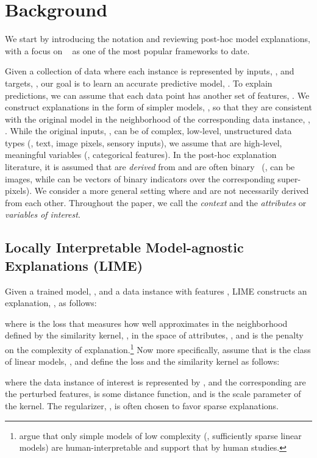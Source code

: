 \documentclass[twoside,11pt]{article}
\begin{document}
\section{Background}
\label{sec:background}

We start by introducing the notation and reviewing post-hoc model explanations, with a focus on {\LIME}~\citep{ribeiro2016trust} as one of the most popular frameworks to date.

Given a collection of data where each instance is represented by inputs, , and targets, , our goal is to learn an accurate predictive model, .
To explain predictions, we can assume that each data point has another set of features, .
We construct explanations in the form of simpler models, , so that they are consistent with the original model in the neighborhood of the corresponding data instance, \ie, .
While the original inputs, , can be of complex, low-level, unstructured data types (\eg, text, image pixels, sensory inputs), we assume that  are high-level, meaningful variables (\eg, categorical features).
In the post-hoc explanation literature, it is assumed that  are \emph{derived} from  and are often binary~\citep{lundberg2017shap} (\eg,  can be images, while  can be vectors of binary indicators over the corresponding super-pixels).
We consider a more general setting where  and  are not necessarily derived from each other.
Throughout the paper, we call  the \emph{context} and  the \emph{attributes} or \emph{variables of interest}.

\subsection*{Locally Interpretable Model-agnostic Explanations (LIME)}
\label{sec:lime}

Given a trained model, , and a data instance with features , LIME constructs an explanation, , as follows:

where  is the loss that measures how well  approximates  in the neighborhood defined by the similarity kernel, , in the space of attributes, , and  is the penalty on the complexity of explanation.\footnote{\citet{ribeiro2016trust} argue that only simple models of low complexity (\eg, sufficiently sparse linear models) are human-interpretable and support that by human studies.}
Now more specifically, \citet{ribeiro2016trust} assume that  is the class of linear models, , and define the loss and the similarity kernel as follows:

where the data instance of interest is represented by ,  and the corresponding  are the perturbed features,  is some distance function, and  is the scale parameter of the kernel.
The regularizer, , is often chosen to favor sparse explanations.
\end{document}
